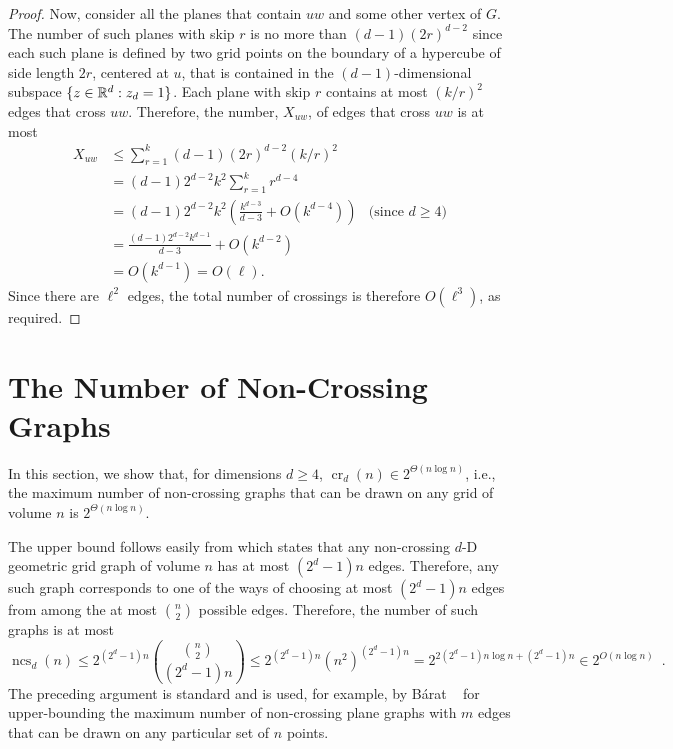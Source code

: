 \documentclass{patmorin}
\DeclareMathOperator{\crs}{cr}
\DeclareMathOperator{\ncs}{ncs}
\begin{document}
\begin{proof}
  Now, consider all the planes that contain $uw$ and some other vertex
  of $G$.  The number of such planes with skip $r$ is no more than
  $(d-1)(2r)^{d-2}$ since each such plane is defined by two grid points on
  the boundary of a hypercube of side length $2r$, centered at $u$, that
  is contained in the $(d-1)$-dimensional subspace $\{z\in\mathbb{R}^d:z_d=1\}$.
  Each plane with skip $r$ contains at most $(k/r)^2$ edges that cross
  $uw$.  Therefore, the number, $X_{uw}$, of edges that cross $uw$
  is at most
  \begin{align*}
     X_{uw} & \le \sum_{r=1}^k(d-1)(2r)^{d-2}(k/r)^2 \\
         & = (d-1)2^{d-2}k^2\sum_{r=1}^k r^{d-4} \\
         & = (d-1)2^{d-2}k^2\left(\frac{k^{d-3}}{d-3} 
             + O\left(k^{d-4}\right)\right) 
               & \text{(since $d\ge 4$)} \\
         & = \frac{(d-1)2^{d-2}k^{d-1}}{d-3} + O(k^{d-2}) \\
         & = O(k^{d-1}) = O(\ell).
  \end{align*}
  Since there are $\ell^2$ edges, the total number of crossings is
  therefore $O(\ell^3)$, as required.
\end{proof}

\section{The Number of Non-Crossing Graphs}

In this section, we show that, for dimensions $d\ge 4$, $\crs_d(n)\in
2^{\Theta(n\log n)}$, i.e., the maximum number of non-crossing graphs
that can be drawn on any grid of volume $n$ is $2^{\Theta(n\log n)}$.

The upper bound follows easily from  which states that
any non-crossing $d$-D geometric grid graph of volume $n$ has at most
$(2^d-1)n$ edges.  Therefore, any such graph corresponds to one of
the ways of choosing at most $(2^d-1)n$ edges from among the at most
$\binom{n}{2}$ possible edges.  Therefore, the number of such graphs is
at most
\[
  \ncs_d(n) \le 2^{(2^d-1)n}\binom{\binom{n}{2}}{(2^d-1)n} 
      \le 2^{(2^d-1)n} (n^{2})^{(2^d-1)n} 
      = 2^{2(2^d-1)n\log n+(2^d-1)n} 
      \in 2^{O(n\log n)} \enspace .
\]
The preceding argument is standard and is used, for example, by B\'arat
\etal~\cite[Lemma~4]{barat.matousek.ea:bounded-degree} for upper-bounding
the maximum number of non-crossing plane graphs with $m$ edges that can
be drawn on any particular set of $n$ points.
\end{document}
